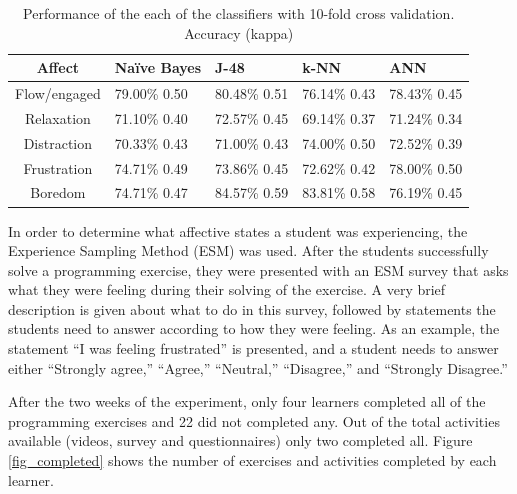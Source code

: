 \documentclass[a4paper]{llncs}
\begin{document}
\begin{table}[!t]
\centering
\caption{Performance of the each of the classifiers with 10-fold cross validation. Accuracy (kappa) }
\label{tab_performance}
    \begin{tabular}{ | c | l | l | l | l | }
    \hline
    Affect          & Na\"ive Bayes           & J-48                & k-NN              & ANN \\
    \hline
    Flow/engaged    & 79.00\% 0.50 & 80.48\% 0.51 & 76.14\% 0.43 & 78.43\% 0.45 \\
    \hline
    Relaxation      & 71.10\% 0.40 & 72.57\% 0.45 & 69.14\% 0.37 & 71.24\% 0.34\\
    \hline
    Distraction     & 70.33\% 0.43 & 71.00\% 0.43 & 74.00\% 0.50 & 72.52\% 0.39\\
    \hline
    Frustration     & 74.71\% 0.49 & 73.86\% 0.45 & 72.62\% 0.42 & 78.00\% 0.50\\
    \hline
    Boredom         & 74.71\% 0.47 & 84.57\% 0.59 & 83.81\% 0.58 & 76.19\% 0.45\\
    \hline
    \end{tabular}
\end{table}



In order to determine what affective states a student was experiencing, the
Experience Sampling Method (ESM) \cite{kubey1996experience} was used.
After the students successfully solve a programming exercise, they were presented
with an ESM survey that asks what they were feeling during their solving of the
exercise. A very brief description is given about what to do in this survey,
followed by statements the students need to answer according to how they were
feeling. As an example, the statement “I was feeling frustrated” is presented,
and a student needs to answer either “Strongly agree,” “Agree,” “Neutral,”
“Disagree,” and “Strongly Disagree.”

After the two weeks of the experiment, only four learners completed all of the
programming exercises and 22 did not completed any. Out of the total activities
available (videos, survey and questionnaires) only two completed all. Figure \ref{fig_completed}
shows the number of exercises and activities completed by each learner.
  
\end{document}
